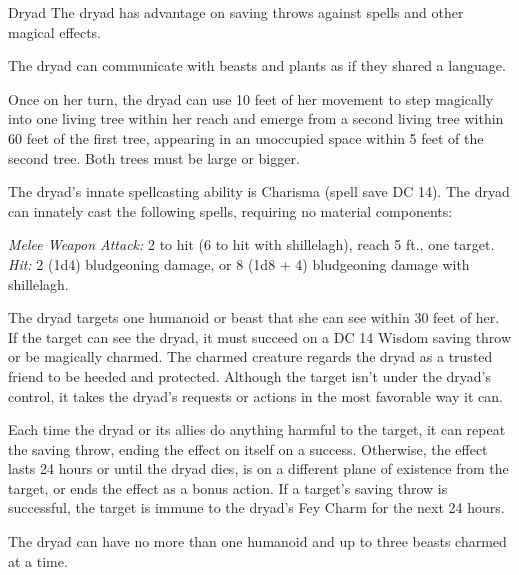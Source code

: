 \documentclass[10pt,a4paper,twoside,bg=print,twocolumn,openany,nodeprecatedcode]{dndbook}
\begin{document}
\begin{DndMonster}[float=t]{Dryad}
\DndMonsterBasics[
armor-class = {11 (16 with \textit{barkskin})},
hit-points = {\DndDice{5d8}},
speed = {30 ft.}
]
\DndMonsterAbilityScores[
 str = 10,
 dex = 12,
 con = 11,
 int = 14,
 wis = 15,
 cha = 18
]
\DndMonsterDetails[
skills = {Perception +4, Stealth +5},
senses = {darkvision 60 ft., passive perception 14},
languages = {Elvish, Sylvan},
challenge = 1,
]
The dryad has advantage on saving throws against spells and other magical effects.

The dryad can communicate with beasts and plants as if they shared a language.

Once on her turn, the dryad can use 10 feet of her movement to step magically into one living tree within her reach and emerge from a second living tree within 60 feet of the first tree, appearing in an unoccupied space within 5 feet of the second tree. Both trees must be large or bigger.

The dryad's innate spellcasting ability is Charisma (spell save DC 14). The dryad can innately cast the following spells, requiring no material components:
\begin{DndMonsterSpells}
\end{DndMonsterSpells}
\textsl{Melee Weapon Attack:} 2 to hit (6 to hit with shillelagh), reach 5 ft., one target. \textsl{Hit:} 2 (1d4) bludgeoning damage, or 8 (1d8 + 4) bludgeoning damage with shillelagh.

The dryad targets one humanoid or beast that she can see within 30 feet of her. If the target can see the dryad, it must succeed on a DC 14 Wisdom saving throw or be magically charmed. The charmed creature regards the dryad as a trusted friend to be heeded and protected. Although the target isn't under the dryad's control, it takes the dryad's requests or actions in the most favorable way it can.

Each time the dryad or its allies do anything harmful to the target, it can repeat the saving throw, ending the effect on itself on a success. Otherwise, the effect lasts 24 hours or until the dryad dies, is on a different plane of existence from the target, or ends the effect as a bonus action. If a target's saving throw is successful, the target is immune to the dryad's Fey Charm for the next 24 hours.

The dryad can have no more than one humanoid and up to three beasts charmed at a time.

\end{DndMonster}
\end{document}
